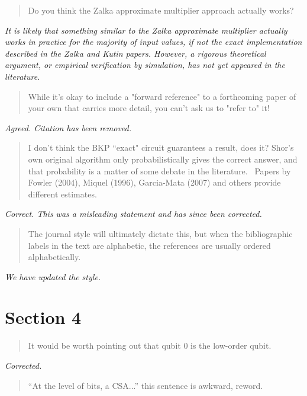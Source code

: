 \documentclass{article}
\theoremstyle{plain} \newtheorem{lemma}{Lemma}
\begin{document}
\begin{quote}
Do you think the Zalka approximate multiplier approach actually works?
\end{quote}

{\it It is likely that something similar to the Zalka approximate
multiplier actually works in practice for the majority of input values,
if not the exact implementation described in
the Zalka and Kutin papers. However, a rigorous theoretical argument, or
empirical verification by simulation, has not yet appeared in the literature.
}

\begin{quote}
While it's okay to include a "forward reference" to a forthcoming
paper of your own that carries more detail, you can't ask us to "refer
to" it!
\end{quote}

{\it Agreed. Citation has been removed.}

\begin{quote}
I don't think the BKP ``exact" circuit guarantees a result, does it?
Shor's own original algorithm only probabilistically gives the correct
answer, and that probability is a matter of some debate in the
literature.  Papers by Fowler (2004), Miquel (1996), Garcia-Mata
(2007) and others provide different estimates.
\end{quote}

{\it Correct.  This was a misleading statement and has since been corrected.}

\begin{quote}
The journal style will ultimately dictate this, but when the
bibliographic labels in the text are alphabetic, the references are
usually ordered alphabetically.
\end{quote}

{\it We have updated the style.}

\section{Section 4}

\begin{quote}
It would be worth pointing out that qubit 0 is the low-order qubit.
\end{quote}

{\it Corrected.}

\begin{quote}
``At the level of bits, a CSA...'' this sentence is awkward, reword.
\end{quote}
\end{document}
